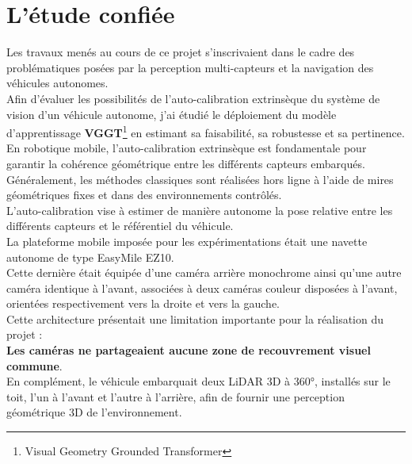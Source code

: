 \documentclass[12pt,a4paper,oneside]{report}
\begin{document}
\newpage

\section{L'étude confiée}

\hspace*{0.3cm}Les travaux menés au cours de ce projet s'inscrivaient dans le cadre des problématiques posées par la perception multi-capteurs et la navigation des véhicules autonomes. \\

\hspace*{.3cm}Afin d'évaluer les possibilités de l'auto-calibration extrinsèque du système de vision d'un véhicule autonome, j'ai étudié le déploiement du modèle d'apprentissage \textbf{VGGT}\footnote{Visual Geometry Grounded Transformer} en estimant sa faisabilité, sa robustesse et sa pertinence.\\

En robotique mobile, l'auto-calibration extrinsèque est fondamentale pour garantir la cohérence géométrique entre les différents capteurs embarqués.\\
Généralement, les méthodes classiques sont réalisées hors ligne à l'aide de mires géométriques fixes et dans des environnements contrôlés.\\
\hspace*{.5cm}L'auto-calibration vise à estimer de manière autonome la pose relative entre les différents capteurs et le référentiel du véhicule.\\

La plateforme mobile imposée pour les expérimentations était une navette autonome de type EasyMile EZ10.\\
\hspace*{.3cm} Cette dernière était équipée d’une caméra arrière monochrome ainsi qu’une autre caméra identique à l'avant, associées à deux caméras couleur disposées à l'avant, orientées respectivement vers la droite et vers la gauche.\\

Cette architecture présentait une limitation importante pour la réalisation du projet :\\

\hspace*{1cm}\textbf{Les caméras ne partageaient aucune zone de recouvrement visuel commune}.\\

\hspace*{.5cm}En complément, le véhicule embarquait deux LiDAR 3D à 360°, installés sur le toit, l’un à l’avant et l’autre à l’arrière, afin de fournir une perception géométrique 3D de l’environnement.\\
\end{document}
